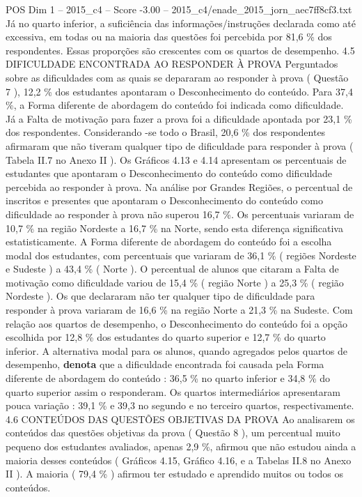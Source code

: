 \begin{textsample}{POS Dim 1 – 2015\_c4 – Score -3.00 – 2015\_c4/enade\_2015\_jorn\_aec7ff8cf3.txt}
Já no quarto inferior, a suficiência das informações/instruções declarada como até excessiva, em todas ou na maioria das questões foi percebida por 81,6 \% dos respondentes.
Essas proporções são crescentes com os quartos de desempenho. 4.5 DIFICULDADE ENCONTRADA AO RESPONDER À PROVA Perguntados sobre as dificuldades com as quais se depararam ao responder à prova ( Questão 7 ), 12,2 \% dos estudantes apontaram o Desconhecimento do conteúdo.
Para 37,4 \%, a Forma diferente de abordagem do conteúdo foi indicada como dificuldade.
Já a Falta de motivação para fazer a prova foi a dificuldade apontada por 23,1 \% dos respondentes.
Considerando -se todo o Brasil, 20,6 \% dos respondentes afirmaram que não tiveram qualquer tipo de dificuldade para responder à prova ( Tabela II.7 no Anexo II ).
Os Gráficos 4.13 e 4.14 apresentam os percentuais de estudantes que apontaram o Desconhecimento do conteúdo como dificuldade percebida ao responder à prova.
Na análise por Grandes Regiões, o percentual de inscritos e presentes que apontaram o Desconhecimento do conteúdo como dificuldade ao responder à prova não superou 16,7 \%.
Os percentuais variaram de 10,7 \% na região Nordeste a 16,7 \% na Norte, sendo esta diferença significativa estatisticamente.
A Forma diferente de abordagem do conteúdo foi a escolha modal dos estudantes, com percentuais que variaram de 36,1 \% ( regiões Nordeste e Sudeste ) a 43,4 \% ( Norte ).
O percentual de alunos que citaram a Falta de motivação como dificuldade variou de 15,4 \% ( região Norte ) a 25,3 \% ( região Nordeste ).
Os que declararam não ter qualquer tipo de dificuldade para responder à prova variaram de 16,6 \% na região Norte a 21,3 \% na Sudeste.
Com relação aos quartos de desempenho, o Desconhecimento do conteúdo foi a opção escolhida por 12,8 \% dos estudantes do quarto superior e 12,7 \% do quarto inferior.
A alternativa modal para os alunos, quando agregados pelos quartos de desempenho, \textbf{denota} que a dificuldade encontrada foi causada pela Forma diferente de abordagem do conteúdo : 36,5 \% no quarto inferior e 34,8 \% do quarto superior assim o responderam.
Os quartos intermediários apresentaram pouca variação : 39,1 \% e 39,3 no segundo e no terceiro quartos, respectivamente. 4.6 CONTEÚDOS DAS QUESTÕES OBJETIVAS DA PROVA Ao analisarem os conteúdos das questões objetivas da prova ( Questão 8 ), um percentual muito pequeno dos estudantes avaliados, apenas 2,9 \%, afirmou que não estudou ainda a maioria desses conteúdos ( Gráficos 4.15, Gráfico 4.16, e a Tabelas II.8 no Anexo II ).
A maioria ( 79,4 \% ) afirmou ter estudado e aprendido muitos ou todos os conteúdos.

\end{textsample}
